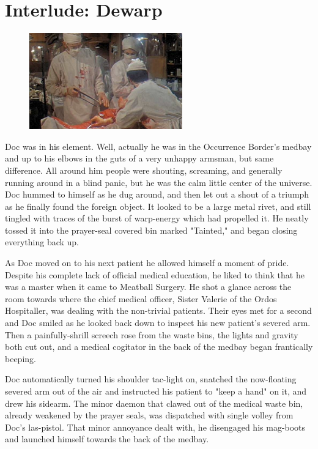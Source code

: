 \chapter{Interlude: Dewarp}

\begin{figure}
	\begin{center}
		\includegraphics[width=\figwidth]{pics/13/1.png}
	\end{center}
\end{figure}
Doc was in his element. 
Well, actually he was in the Occurrence Border's medbay and up to his elbows in the guts of a very unhappy armsman, but same difference. 
All around him people were shouting, screaming, and generally running around in a blind panic, but he was the calm little center of the universe. 
Doc hummed to himself as he dug around, and then let out a shout of a triumph as he finally found the foreign object. 
It looked to be a large metal rivet, and still tingled with traces of the burst of warp-energy which had propelled it. 
He neatly tossed it into the prayer-seal covered bin marked "Tainted," and began closing everything back up.

As Doc moved on to his next patient he allowed himself a moment of pride. 
Despite his complete lack of official medical education, he liked to think that he was a master when it came to Meatball Surgery. 
He shot a glance across the room towards where the chief medical officer, Sister Valerie of the Ordos Hospitaller, was dealing with the non-trivial patients. 
Their eyes met for a second and Doc smiled as he looked back down to inspect his new patient's severed arm. 
Then a painfully-shrill screech rose from the waste bins, the lights and gravity both cut out, and a medical cogitator in the back of the medbay began frantically beeping.

Doc automatically turned his shoulder tac-light on, snatched the now-floating severed arm out of the air and instructed his patient to "keep a hand" on it, and drew his sidearm. 
The minor daemon that clawed out of the medical waste bin, already weakened by the prayer seals, was dispatched with single volley from Doc's las-pistol. 
That minor annoyance dealt with, he disengaged his mag-boots and launched himself towards the back of the medbay. 


